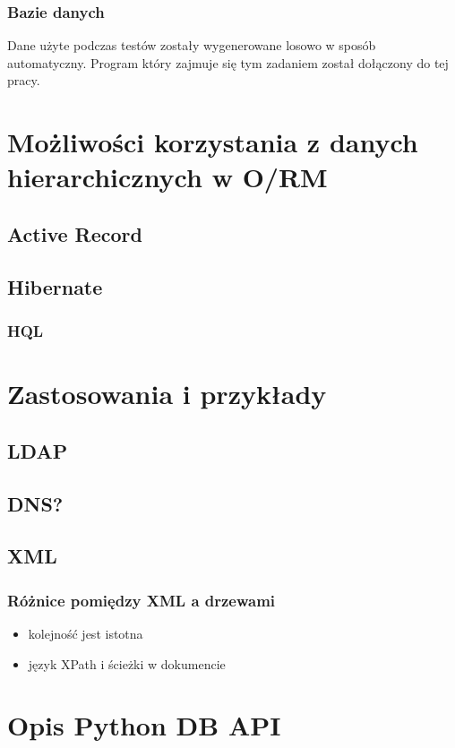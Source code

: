 \documentclass[10pt,a4paper,oneside]{book}
\begin{document}
\subsection{Bazie danych}



Dane użyte podczas testów zostały wygenerowane losowo w sposób automatyczny. Program który zajmuje się tym zadaniem został dołączony do tej pracy.

\chapter{Możliwości korzystania z danych hierarchicznych w O/RM}
\section{Active Record}
\section{Hibernate}
\subsection{HQL}
\chapter{Zastosowania i przykłady}

\section{LDAP}
\section{DNS?}
\section{XML}
\subsection{Różnice pomiędzy XML a drzewami}
\begin{itemize}
 \item kolejność jest istotna
 \item język XPath i ścieżki w dokumencie
\end{itemize}

\appendix

\chapter{Opis Python DB API}
\end{document}
